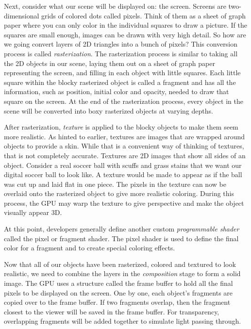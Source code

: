 \documentclass[12pt] {article}
\begin{document}
Next, consider what our scene will be displayed on: the screen. Screens are two-dimensional grids of colored dots called pixels. Think of them as a sheet of graph paper where you can only color in the individual squares to draw a picture. If the squares are small enough, images can be drawn with very high detail. So how are we going convert layers of 2D triangles into a bunch of pixels? This conversion process is called \emph{rasterization}. The rasterization process is similar to taking all the 2D objects in our scene, laying them out on a sheet of graph paper representing the screen, and filling in each object with little squares. Each little square within the blocky rasterized object is called a fragment and has all the information, such as position, initial color and opacity, needed to draw that square on the screen. At the end of the rasterization process, every object in the scene will be converted into boxy rasterized objects at varying depths.

After rasterization, \emph{texture} is applied to the blocky objects to make them seem more realistic. As hinted to earlier, textures are images that are wrapped around objects to provide a skin. While that is a convenient way of thinking of textures, that is not completely accurate. Textures are 2D images that show all sides of an object. Consider a real soccer ball with scuffs and grass stains that we want our digital soccer ball to look like. A texture would be made to appear as if the ball was cut up and laid flat in one piece. The pixels in the texture can now be overlaid onto the rasterized object to give more realistic coloring. During this process, the GPU may warp the texture to give perspective and make the object visually appear 3D.

At this point, developers generally define another custom \emph{programmable shader} called the pixel or fragment shader. The pixel shader is used to define the final color for a fragment and to create special coloring effects. 

Now that all of our objects have been rasterized, colored and textured to look realistic, we need to combine the layers in the \emph{composition} stage to form a solid image. The GPU uses a structure called the frame buffer to hold all the final pixels to be displayed on the screen. One by one, each object's fragments are copied over to the frame buffer. If two fragments overlap, then the fragment closest to the viewer will be saved in the frame buffer. For transparency, overlapping fragments will be added together to simulate light passing through.
\end{document}
